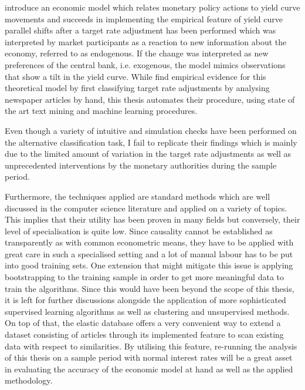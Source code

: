 
\textcite{Ellingsen.2001} introduce an economic model which relates monetary policy actions to yield curve movements and succeeds in implementing the empirical feature of yield curve parallel shifts after a target rate adjustment has been performed which was interpreted by market participants as a reaction to new information about the economy, referred to as endogenous. If the change was interpreted as new preferences of the central bank, i.e. exogenous, the model mimics observations that show a tilt in the yield curve. While \textcite{Ellingsen.2003} find empirical evidence for this theoretical model by first classifying target rate adjustments by analysing newspaper articles by hand, this thesis automates their procedure, using state of the art text mining and machine learning procedures. 

Even though a variety of intuitive and simulation checks have been performed on the alternative classification task, I fail to replicate their findings which is mainly due to the limited amount of variation in the target rate adjustments as well as unprecedented interventions by the monetary authorities during the sample period. 

Furthermore, the techniques applied are standard methods which are well discussed in the computer science literature and applied on a variety of topics. This implies that their utility has been proven in many fields but conversely, their level of specialisation is quite low. Since causality cannot be established as transparently as with common econometric means, they have to be applied with great care in such a specialised setting and a lot of manual labour has to be put into good training sets. One extension that might mitigate this issue is applying bootstrapping to the training sample in order to get more meaningful data to train the algorithms. Since this would have been beyond the scope of this thesis, it is left for further discussions alongside the application of more sophisticated supervised learning algorithms as well as clustering and unsupervised methods. On top of that, the elastic database \parencite{Elastic.2015} offers a very convenient way to extend a dataset consisting of articles through its implemented feature to scan existing data with respect to similarities. By utilising this feature, re-running the analysis of this thesis on a sample period with normal interest rates will be a great asset in evaluating the accuracy of the economic model at hand as well as the applied methodology.
